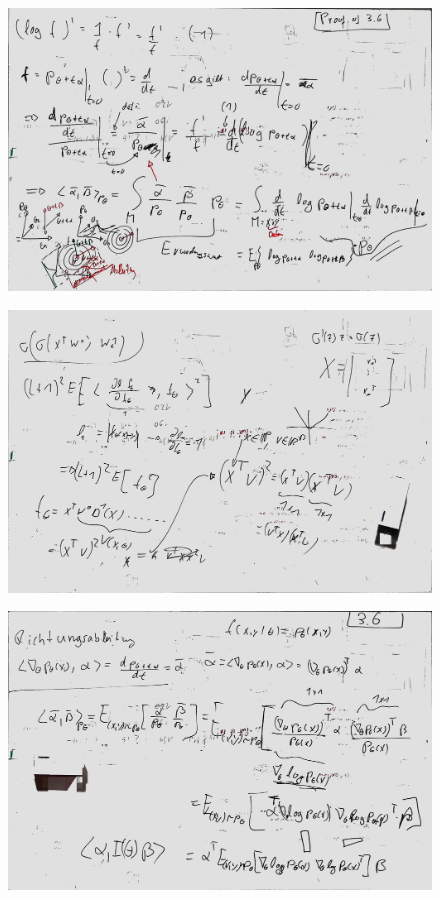 \documentclass[a4paper]{article}
\begin{document}
\begin{figure}[htb]
	\centering
	\includegraphics[width=\textwidth]{whiteboard_notes/11.jpg}
\end{figure}

\begin{figure}[htb]
	\centering
	\includegraphics[width=\textwidth]{whiteboard_notes/12.jpg}
\end{figure}

\begin{figure}[htb]
	\centering
	\includegraphics[width=\textwidth]{whiteboard_notes/13.jpg}
\end{figure}
\end{document}
